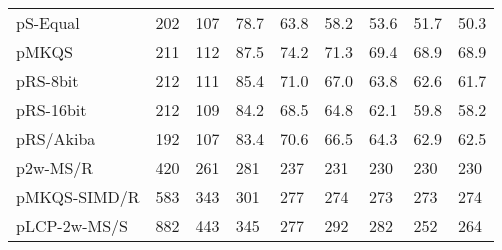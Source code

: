 \documentclass[a4paper]{myjournal}
\begin{document}
\begin{table}
\begin{tabularx}{\linewidth}{l|*{8}{>{\hfill}X}|@{}}
 pS-Equal & 202 &     107 &     78.7 &     63.8 &     58.2 &     53.6 &     51.7 &     50.3 \\
        pMKQS & 211 &     112 &     87.5 &     74.2 &     71.3 &     69.4 &     68.9 &     68.9 \\
     pRS-8bit & 212 &     111 &     85.4 &     71.0 &     67.0 &     63.8 &     62.6 &     61.7 \\
    pRS-16bit & 212 &     109 &     84.2 &     68.5 &     64.8 &     62.1 &     59.8 &     58.2 \\
    pRS/Akiba & 192 &     107 &     83.4 &     70.6 &     66.5 &     64.3 &     62.9 &     62.5 \\
     p2w-MS/R & 420 &     261 &      281 &      237 &      231 &      230 &      230 &      230 \\
 pMKQS-SIMD/R & 583 &     343 &      301 &      277 &      274 &      273 &      273 &      274 \\
 pLCP-2w-MS/S & 882 &     443 &      345 &      277 &      292 &      282 &      252 &      264 \\ \hline
\end{tabularx}
\end{table}
\end{document}
